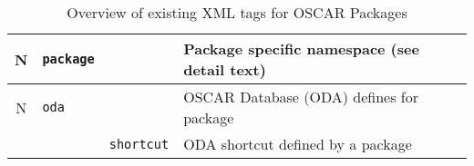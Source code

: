 \begin{table}[htbp]
\begin{center}
\begin{tabular}{|c|l|l|l|}
  N & \verb(package( &    & Package specific namespace (see detail text) \\\hline

  N & \verb(oda(     &    & OSCAR Database (ODA) defines for package     \\\cline{3-4}
    & & \verb(shortcut(   & ODA shortcut defined by a package            \\\hline


  \end{tabular}
  \caption{Overview of existing XML tags for OSCAR Packages} 
  \label{tab:pkg-xml-tags}
  \end{center}  
\end{table}
